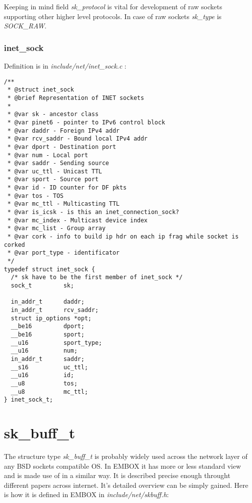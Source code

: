 \documentclass[12pt,a4paper]{article}
\begin{document}
Keeping in mind field {\it sk\_protocol} is vital for development of raw 
sockets supporting other higher level protocols. In case of raw sockets
{\it sk\_type} is {\it SOCK\_RAW}.

\subsubsection{inet\_sock}
\label{sec:af_inet_inet_sock}
Definition is in {\it include/net/inet\_sock.c} :
\begin{verbatim}
/**
 * @struct inet_sock
 * @brief Representation of INET sockets
 *
 * @var sk - ancestor class
 * @var pinet6 - pointer to IPv6 control block
 * @var daddr - Foreign IPv4 addr
 * @var rcv_saddr - Bound local IPv4 addr
 * @var dport - Destination port
 * @var num - Local port
 * @var saddr - Sending source
 * @var uc_ttl - Unicast TTL
 * @var sport - Source port
 * @var id - ID counter for DF pkts
 * @var tos - TOS
 * @var mc_ttl - Multicasting TTL
 * @var is_icsk - is this an inet_connection_sock?
 * @var mc_index - Multicast device index
 * @var mc_list - Group array
 * @var cork - info to build ip hdr on each ip frag while socket is corked
 * @var port_type - identificator
 */
typedef struct inet_sock {
  /* sk have to be the first member of inet_sock */
  sock_t         sk;

  in_addr_t      daddr;
  in_addr_t      rcv_saddr;
  struct ip_options *opt;
  __be16         dport;
  __be16         sport;
  __u16          sport_type;
  __u16          num;
  in_addr_t      saddr;
  __s16          uc_ttl;
  __u16          id;
  __u8           tos;
  __u8           mc_ttl;
} inet_sock_t;
\end{verbatim}

\newpage
\section{sk\_buff\_t}
\label{sec:sk_buff_t}
The structure type {\it sk\_buff\_t} is probably widely used across the network
layer of any BSD sockets compatible OS. In EMBOX it has more or less standard
view and is made use of in a similar way. It is described precise enough throught
different papers across internet. It's detailed overview can be simply gained.
Here is how it is defined in EMBOX in {\it include/net/skbuff.h}:
\end{document}
